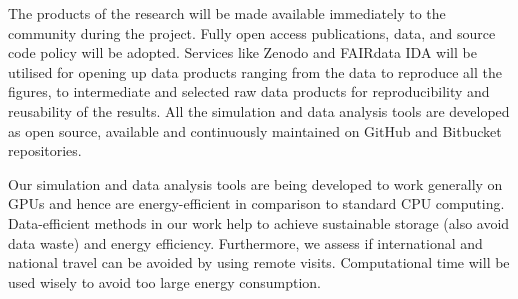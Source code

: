 \documentclass[a4paper,12pt]{article}
\newcommand{\instructions}[1]{\textcolor{blue}{#1}}
\begin{document}
The products of the research will be made available immediately to the
community during the project. Fully open access publications, data, and source
code policy will be adopted. Services like Zenodo and FAIRdata IDA will be
utilised for opening up data products ranging from the data to reproduce all
the ﬁgures, to intermediate and selected raw data products for reproducibility
and reusability of the results. All the simulation and data analysis tools are
developed as open source, available and continuously maintained on GitHub and
Bitbucket repositories.

Our simulation and data analysis tools are being developed to work generally on
GPUs and hence are energy-eﬃcient in comparison to standard CPU computing.
Data-eﬃcient methods in our work help to achieve sustainable storage (also
avoid data waste) and energy eﬃciency. Furthermore, we assess if international
and national travel can be avoided by using remote visits. Computational time
will be used wisely to avoid too large energy consumption.

\renewcommand\refname{References}


%
%

\label{lastpage}
\end{document}
